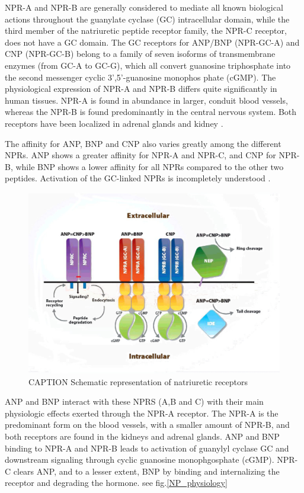 \documentclass[14pt,a4paper,onecolumn]{extarticle}
\begin{document}
NPR-A and NPR-B are generally considered to mediate all known biological actions throughout the guanylate cyclase (GC) intracellular domain, while the third member of the natriuretic peptide receptor family, the NPR-C receptor, does not have a GC domain.  The GC receptors for ANP/BNP (NPR-GC-A) and CNP (NPR-GC-B) belong to a family of seven isoforms of transmembrane enzymes (from GC-A to GC-G), which all convert guanosine triphosphate into the second messenger cyclic 3’,5’-guanosine monophos phate (cGMP).  The physiological expression of NPR-A and NPR-B differs quite significantly in human tissues. NPR-A is found in abundance in larger, conduit blood vessels, whereas the NPR-B is found predominantly in the central nervous system. Both receptors have been localized in adrenal glands and kidney \citep{bib355}.

The affinity for ANP, BNP and CNP also varies greatly among the different NPRs.  ANP shows a greater affinity for NPR-A and NPR-C, and CNP for NPR-B, while BNP shows a lower affinity for all NPRs compared to the other two peptides.  Activation of the GC-linked NPRs is incompletely understood \citep{172}.

\begin{figure}      \centering      \includegraphics[scale=1]{../../images/NP_receptors.jpg}     \small\caption{CAPTION Schematic representation of natriuretic receptors}      \label{NP_receptors}  \end{figure}

ANP and BNP interact with these NPRS (A,B and C)  with their main physiologic effects exerted through the NPR-A receptor.  The NPR-A is the predominant form on the blood vessels, with a smaller amount of NPR-B, and both receptors are found in the kidneys and adrenal glands.  ANP and BNP binding to NPR-A and NPR-B leads to activation of guanylyl cyclase GC and downstream signaling through cyclic guanosine monophgosphate (cGMP).  NPR-C clears ANP, and to a lesser extent, BNP by binding and internalizing the receptor and degrading the hormone. see fig.\ref{NP_physiology} \citep{Maisel2018}
\end{document}
